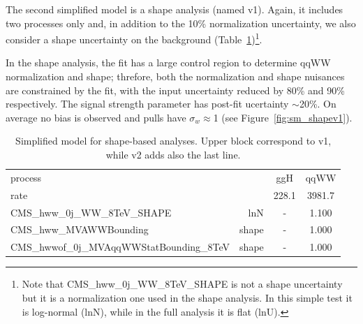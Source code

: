 
The second simplified model is a shape analysis (named v1). 
Again, it includes two processes only and, in addition to the 10\% normalization uncertainty, we also consider a shape 
uncertainty on the background (Table~\ref{tab:modelshapebased})\footnote{Note that CMS\_hww\_0j\_WW\_8TeV\_SHAPE is not a shape uncertainty but it is a normalization one used in the shape analysis. In this simple test it is log-normal (lnN), while in the full analysis it is flat (lnU).}.

In the shape analysis, the fit has a large control region to determine qqWW normalization and shape; 
threfore, both the normalization and shape nuisances are constrained by the fit, with the input uncertainty reduced 
by 80\% and 90\% respectively. The signal strength parameter has post-fit ucertainty $\sim$20\%.
On average no bias is observed and pulls have $\sigma_{w}$$\approx$1 (see Figure~\ref{fig:sm_shapev1}).

\begin{table}[!hbtp]
\begin{center}
\begin{tabular}{l r c c}
\hline
process                                   &       & ggH   & qqWW   \\
rate                                      &       & 228.1 & 3981.7 \\
CMS\_hww\_0j\_WW\_8TeV\_SHAPE             & lnN   &  -    & 1.100  \\
CMS\_hww\_MVAWWBounding                   & shape &  -    & 1.000  \\
\hline
\hline
CMS\_hwwof\_0j\_MVAqqWWStatBounding\_8TeV & shape &  -    & 1.000  \\
\hline
\end{tabular}
\caption{Simplified model for shape-based analyses. Upper block correspond to v1, while v2 adds also the last line.}
\label{tab:modelshapebased}
\end{center}
\end{table}


